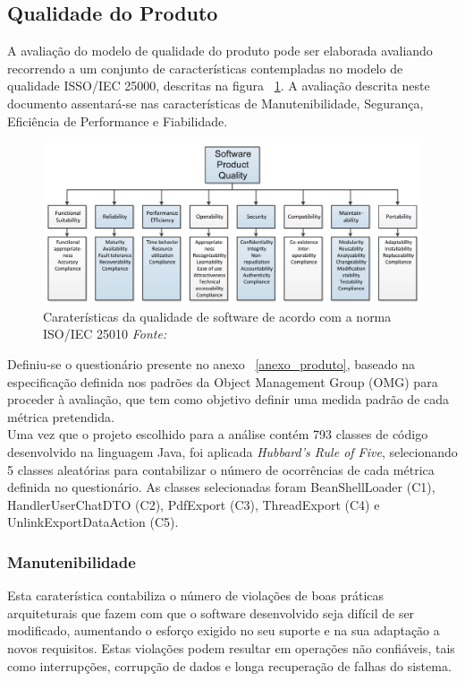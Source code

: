 \documentclass[openany,10pt,a4paper]{article}
\begin{document}
\subsection{Qualidade do Produto}
A avaliação do modelo de qualidade do produto pode ser elaborada avaliando recorrendo a um conjunto de características contempladas no modelo de qualidade ISSO/IEC 25000, descritas na figura ~\ref{fig_quality}. A avaliação descrita neste documento assentará-se nas características de Manutenibilidade, Segurança, Eficiência de Performance e Fiabilidade.

\begin{figure}[h]
	\centering
	\includegraphics[width=1\linewidth]{quality.PNG}
	\caption{Caraterísticas da qualidade de software de acordo com a norma ISO/IEC 25010 \small{\textit{Fonte: 	\cite{OMG_Performance}}}}
	\label{fig_quality}
\end{figure}

Definiu-se o questionário presente no anexo ~\ref{anexo_produto}, baseado na especificação definida nos padrões da Object Management Group (OMG) para proceder à avaliação, que tem como objetivo definir uma medida padrão de cada métrica pretendida. \\
Uma vez que o projeto escolhido para a análise contém 793 classes de código desenvolvido na linguagem Java, foi aplicada 
\textit{Hubbard’s Rule of Five}, selecionando 5 classes aleatórias para contabilizar o número de ocorrências de cada métrica definida no questionário. As classes selecionadas foram BeanShellLoader (C1), HandlerUserChatDTO (C2), PdfExport (C3), ThreadExport (C4) e UnlinkExportDataAction (C5).

\subsubsection{Manutenibilidade}
Esta caraterística contabiliza o número de violações de boas práticas arquiteturais que fazem com que o software desenvolvido seja difícil de ser modificado, aumentando o esforço exigido no seu suporte e na sua adaptação a novos requisitos. Estas violações podem resultar em operações não confiáveis, tais como interrupções, corrupção de dados e longa recuperação de falhas do sistema. \cite{OMG_Maintainability}
\end{document}
